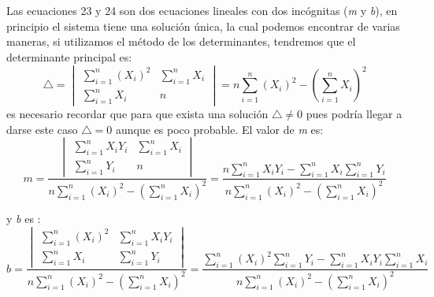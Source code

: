\documentclass[12pt,letterpaper]{report}
\begin{document}
Las ecuaciones 23 y 24 son dos ecuaciones lineales con dos incógnitas (\textit{m} y \textit{b}), en principio el sistema tiene una solución única, la cual  podemos encontrar de varias maneras, si utilizamos el método de los determinantes, tendremos que el determinante principal es:
\begin{equation}
 \triangle =
 \begin{vmatrix}
 \displaystyle\sum_{i=1}^{n}(X_{i})^{2} & \displaystyle\sum_{i=1}^{n}X_{i} \\
 \displaystyle\sum_{i=1}^{n}X_{i} & n
 \end{vmatrix}
 = n\sum_{i=1}^{n}(X_{i})^{2}-\left( \sum_{i=1}^{n}X_{i}\right) ^{2}
 \end{equation} 
es necesario recordar que para que exista una solución $ \triangle \neq 0$ pues podría llegar a darse este caso $ \triangle = 0$ aunque es poco probable. El valor de  \textit{m} es:
\begin{equation}\label{pendiente}
 m= \dfrac{\begin{vmatrix}
  \displaystyle\sum_{i=1}^{n}X_{i}Y_{i}& \displaystyle\sum_{i=1}^{n}X_{i} \\
 \displaystyle\sum_{i=1}^{n}Y_{i} & n
 \end{vmatrix}
 }{n\displaystyle\sum_{i=1}^{n}(X_{i})^{2}-\left( \displaystyle\sum_{i=1}^{n}X_{i}\right) ^{2}} =\dfrac{n \displaystyle\sum_{i=1}^{n}X_{i}Y_{i}-\displaystyle\sum_{i=1}^{n}X_{i} \displaystyle\sum_{i=1}^{n}Y_{i}}{n\displaystyle\sum_{i=1}^{n}(X_{i})^{2}-\left( \displaystyle\sum_{i=1}^{n}X_{i}\right) ^{2}}
\end{equation}

y \textit{b} es :
\begin{equation}\label{ordenadaorigen}
b= \dfrac{\begin{vmatrix}
\displaystyle\sum_{i=1}^{n}(X_{i})^{2} & \displaystyle\sum_{i=1}^{n}X_{i}Y_{i}\\
\displaystyle\sum_{i=1}^{n}X_{i} & \displaystyle\sum_{i=1}^{n}Y_{i}
 \end{vmatrix}
}{n\displaystyle\sum_{i=1}^{n}(X_{i})^{2}-\left( \displaystyle\sum_{i=1}^{n}X_{i}\right) ^{2}} = \dfrac{\displaystyle\sum_{i=1}^{n}(X_{i})^{2}\displaystyle\sum_{i=1}^{n}Y_{i}-\displaystyle\sum_{i=1}^{n}X_{i}Y_{i}\displaystyle\sum_{i=1}^{n}X_{i} }{n\displaystyle\sum_{i=1}^{n}(X_{i})^{2}- \left( \displaystyle\sum_{i=1}^{n}X_{i}\right) ^{2}}
\end{equation}
\end{document}
